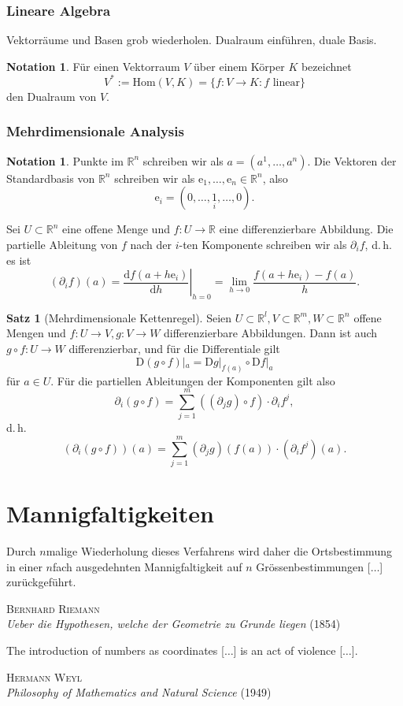 \documentclass[a4paper]{scrreprt}
\numberwithin{equation}{chapter}
\newcommand{\D}{\mathrm{d}}
\newcommand{\DD}{\mathrm{D}}
\newcommand{\e}{\mathrm{e}}
\theoremstyle{definition}
\newtheorem{satz}[defn]{Satz}
\newtheorem{nota}[defn]{Notation}
\begin{document}
\subsection{Lineare Algebra}

Vektorräume und Basen grob wiederholen. Dualraum einführen, duale Basis.

\begin{nota}
	Für einen Vektorraum $V$ über einem Körper $K$ bezeichnet \[V^* := \mathrm{Hom}(V,K) = \{f\colon V \to K : f \text{ linear}\}\] den Dualraum von $V$.
\end{nota}

\subsection{Mehrdimensionale Analysis}
\begin{nota}
	Punkte im $\mathbb R^n$ schreiben wir als $a = (a^1, \dots, a^n)$. Die Vektoren der Standardbasis von $\mathbb R^n$ schreiben wir als $\e_1, \dots, \e_n \in \mathbb R^n$, also \[\e_i = (0,\dots,\underset{i}{1},\dots,0).\]

	Sei $U \subset \mathbb R^n$ eine offene Menge und $f\colon U \to \mathbb R$ eine differenzierbare Abbildung. Die partielle Ableitung von $f$ nach der $i$-ten Komponente schreiben wir als $\partial_i f$, d.\,h. es ist
	\[(\partial_i f)(a) = \left.\frac{\D f(a + h \e_i)}{\D h}\right|_{h=0} = \lim_{h\to 0} \frac{f(a + h \e_i) - f(a)}{h}.\]
\end{nota}

\begin{satz}[Mehrdimensionale Kettenregel]
	Seien $U \subset \mathbb R^l, V \subset \mathbb R^m, W \subset \mathbb R^n$ offene Mengen und $f\colon U\to V, g\colon V \to W$ differenzierbare Abbildungen. Dann ist auch $g\circ f\colon U \to W$ differenzierbar, und für die Differentiale gilt
	\[\DD(g\circ f)|_a = \DD g|_{f(a)} \circ \DD f|_a\]
	für $a \in U$. Für die partiellen Ableitungen der Komponenten gilt also
	\[\partial_i(g\circ f) = \sum_{j = 1}^m ((\partial_j g)\circ f) \cdot \partial_i f^j,\]
	d.\,h.
	\[(\partial_i(g\circ f))(a) = \sum_{j = 1}^m (\partial_j g)(f(a)) \cdot (\partial_i f^j)(a).\]
\end{satz}


\chapter{Mannigfaltigkeiten}
\epigraph{Durch $n$malige Wiederholung dieses Verfahrens wird daher die Ortsbestimmung in einer $n$fach ausgedehnten Mannigfaltigkeit auf $n$ Grössenbestimmungen [$\ldots$] zurückgeführt.}{\textsc{Bernhard Riemann}\\\emph{Ueber die Hypothesen, welche der Geometrie zu Grunde liegen} (1854)}
\epigraph{The introduction of numbers as coordinates [$\ldots$] is an act of violence [$\ldots$].}{\textsc{Hermann Weyl}\\\emph{Philosophy of Mathematics and Natural Science} (1949)}
\end{document}
